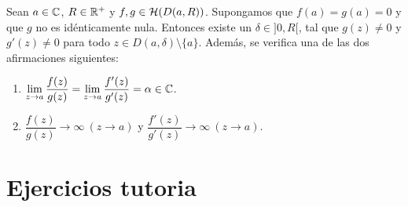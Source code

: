 \documentclass[12pt]{article}
\begin{document}
    \begin{teo} Sean $a\in \mathbb{C}$, $R\in \mathbb{R}^+$ y $f,g\in \mathcal{H}(D(a, R))$. Supongamos que $f(a)=g(a)=0$ y que $g$ no es idénticamente nula. Entonces existe un $\delta \in ]0,R[$, tal que $g(z)\neq 0$ y $g'(z)\neq 0$ para todo $z\in D(a, \delta)\setminus \{a\}$. Además, se verifica una de las dos afirmaciones siguientes:
    \begin{enumerate}
        \item $\displaystyle \lim\limits_{z\to a} \frac{f(z)}{g(z)} = \lim\limits_{z\to a} \frac{f'(z)}{g'(z)} = \alpha \in \mathbb{C}$.
        \item $\dfrac{f(z)}{g(z)} \to \infty\  (z \to a)$ y $\dfrac{f'(z)}{g'(z)} \to \infty\ (z \to a)$.
    \end{enumerate}
        
    \end{teo}

    \newpage

    \section{Ejercicios tutoria}
\end{document}
